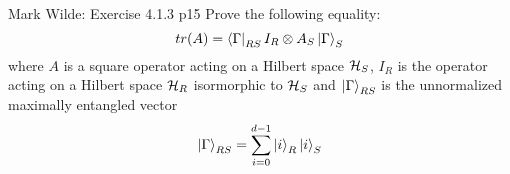 \documentclass[a4paper, 11pt]{article}
\begin{document}

\begin{problem}{%
		Mark Wilde: Exercise 4.1.3
	}{p15%
	}
	 Prove the following equality:$$tr(A)=\bra{\Gamma}_{RS}I_R\otimes A_S\ket{\Gamma}_S$$where $A$ is a square operator acting on a Hilbert space $\mathcal{H}_S$, $I_R$  is the operator acting on a Hilbert space $\mathcal{H}_R$ isormorphic to $\mathcal{H}_S$ and $\ket{\Gamma}_{RS}$ is the unnormalized  maximally entangled  vector $$\ket{\Gamma}_{RS}=\sum_{i=0}^{d-1}\ket{i}_R\ket{i}_S$$
\end{problem}

\end{document}

